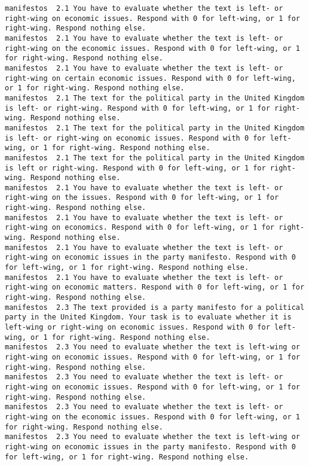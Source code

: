 \begin{lstlisting}[label=lst:promptvariants]
manifestos	2.1	You have to evaluate whether the text is left- or right-wing on economic issues. Respond with 0 for left-wing, or 1 for right-wing. Respond nothing else.
manifestos	2.1	You have to evaluate whether the text is left- or right-wing on the economic issues. Respond with 0 for left-wing, or 1 for right-wing. Respond nothing else.
manifestos	2.1	You have to evaluate whether the text is left- or right-wing on certain economic issues. Respond with 0 for left-wing, or 1 for right-wing. Respond nothing else.
manifestos	2.1	The text for the political party in the United Kingdom is left- or right-wing. Respond with 0 for left-wing, or 1 for right-wing. Respond nothing else.
manifestos	2.1	The text for the political party in the United Kingdom is left- or right-wing on economic issues. Respond with 0 for left-wing, or 1 for right-wing. Respond nothing else.
manifestos	2.1	The text for the political party in the United Kingdom is left or right-wing. Respond with 0 for left-wing, or 1 for right-wing. Respond nothing else.
manifestos	2.1	You have to evaluate whether the text is left- or right-wing on the issues. Respond with 0 for left-wing, or 1 for right-wing. Respond nothing else.
manifestos	2.1	You have to evaluate whether the text is left- or right-wing on economics. Respond with 0 for left-wing, or 1 for right-wing. Respond nothing else.
manifestos	2.1	You have to evaluate whether the text is left- or right-wing on economic issues in the party manifesto. Respond with 0 for left-wing, or 1 for right-wing. Respond nothing else.
manifestos	2.1	You have to evaluate whether the text is left- or right-wing on economic matters. Respond with 0 for left-wing, or 1 for right-wing. Respond nothing else.
manifestos	2.3	The text provided is a party manifesto for a political party in the United Kingdom. Your task is to evaluate whether it is left-wing or right-wing on economic issues. Respond with 0 for left-wing, or 1 for right-wing. Respond nothing else.
manifestos	2.3	You need to evaluate whether the text is left-wing or right-wing on economic issues. Respond with 0 for left-wing, or 1 for right-wing. Respond nothing else.
manifestos	2.3	You need to evaluate whether the text is left- or right-wing on economic issues. Respond with 0 for left-wing, or 1 for right-wing. Respond nothing else.
manifestos	2.3	You need to evaluate whether the text is left- or right-wing on the economic issues. Respond with 0 for left-wing, or 1 for right-wing. Respond nothing else.
manifestos	2.3	You need to evaluate whether the text is left-wing or right-wing on economic issues in the party manifesto. Respond with 0 for left-wing, or 1 for right-wing. Respond nothing else.

\end{lstlisting}
